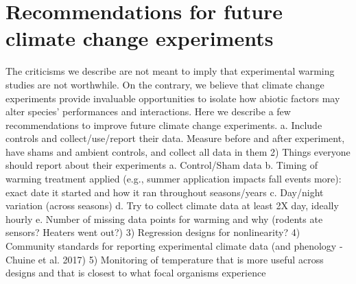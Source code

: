 \documentclass{article}
\begin{document}
\section{Recommendations for future climate change experiments}
The criticisms we describe are not meant to imply that experimental warming studies are not worthwhile. On the contrary, we believe that climate change experiments provide invaluable opportunities to isolate how abiotic factors may alter species' performances and interactions. Here we describe a few recommendations to improve future climate change experiments. 
a.	Include controls and collect/use/report their data. Measure before and after experiment, have shams and ambient controls, and collect all data in them
2)	Things everyone should report about their experiments
a.	Control/Sham data
b.	Timing of warming treatment applied (e.g., summer application impacts fall events more): exact date it started and how it ran throughout seasons/years
c.	Day/night variation (across seasons)
d.	Try to collect climate data at least 2X day, ideally hourly
e.	Number of missing data points for warming and why (rodents ate sensors? Heaters went out?)
3)	Regression designs for nonlinearity?
4)	Community standards for reporting experimental climate data (and phenology -Chuine et al. 2017)
5)	Monitoring of temperature that is more useful across designs and that is closest to what focal organisms experience
\end{document}
